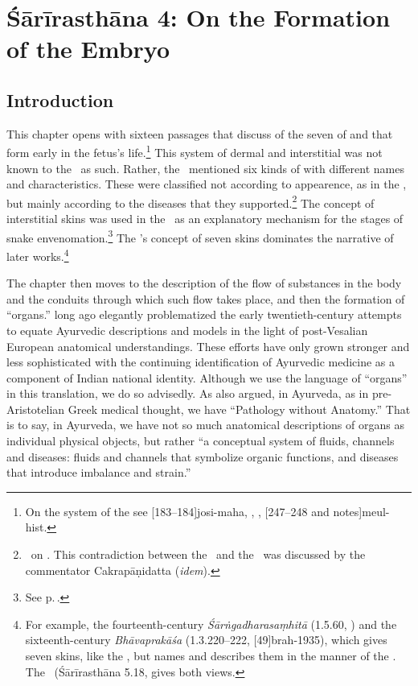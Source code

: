 
\chapter{Śārīrasthāna 4:  On the Formation of the Embryo}


\section{Introduction}

This chapter opens with sixteen passages that discuss of the seven
of  and  that form early
in the fetus's life.\footnote{On the system of the  see
    [183--184]{josi-maha}, \cite[227--228]{gupt-1983},
    \cite[6]{kutu-1962}, [247--248 and notes]{meul-hist}.} This
    system of dermal and interstitial  was not
    known to the \CS\ as such.  Rather, the \CS\ mentioned six kinds of
     with different names and characteristics.
    These were classified not according to appearence, as in the \SS, but
    mainly according to the diseases that they
    supported.\footnote{\label{sa4:kalā}\CS\ on . This
        contradiction between the \CS\ and the \SS\ was discussed by the
        commentator Cakrapāṇidatta (\emph{idem}).} The concept of interstitial
        skins was used in the \SS\ as an explanatory mechanism for the stages
        of snake envenomation.\footnote{See p.\,\pageref{ka4:kalā-vega}.} The
            \SS's concept of seven skins dominates the narrative of later
            works.\footnote{For example, the fourteenth-century
                \emph{Śārṅgadharasaṃhitā} (1.5.60, \cite[40]{sast-1931}) and the
                sixteenth-century \emph{Bhāvaprakāśa} (1.3.220--222,
                [49]{brah-1935}), which gives seven skins, like the \SS,
                but names and describes them in the manner of the \CS. The \AS\
                (Śārīrasthāna 5.18, \cite[296--297]{atha-1980} gives both views.}

The chapter then moves to the description of the flow of substances in
the body and the conduits through which such flow takes place, and
then the formation of “organs.” \citet{zimm-1978,zimm-1978b} long ago
elegantly problematized the early twentieth-century attempts to equate
Ayurvedic descriptions and models in the light of post-Vesalian
European anatomical understandings. These efforts have only grown
stronger and less sophisticated with the continuing identification of
Ayurvedic medicine as a component of Indian national identity.
Although we use the language of “organs” in this translation, we do so
advisedly.  As \citet{zimm-1979} also argued, in Ayurveda, as in
pre-Aristotelian Greek medical thought, we have “Pathology without
Anatomy.”  That is to say, in Ayurveda, we have not so much 
anatomical descriptions of organs as individual physical objects, but
rather “a conceptual system of fluids, channels and diseases: fluids
and channels that symbolize organic functions, and diseases that
introduce imbalance and strain.”


